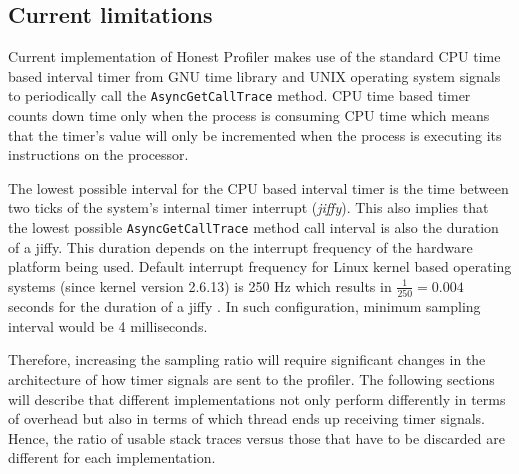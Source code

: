 \documentclass[..thesis.tex]{subfiles}
\begin{document}

\subsection{Current limitations}
Current implementation of Honest Profiler makes use of the standard CPU time based interval timer from GNU time library and UNIX operating system signals to periodically call the \texttt{AsyncGetCallTrace} method. CPU time based timer counts down time only when the process is consuming CPU time which means that the timer's value will only be incremented when the process is executing its instructions on the processor.

The lowest possible interval for the CPU based interval timer is the time between two ticks of the system's internal timer interrupt (\textit{jiffy}). This also implies that the lowest possible \texttt{Async\-Get\-Call\-Trace} method call interval is also the duration of a jiffy. This duration depends on the interrupt frequency of the hardware platform being used. Default interrupt frequency for Linux kernel based operating systems (since kernel version 2.6.13) is 250 Hz which results in $\frac{1}{250} = 0.004$ seconds for the duration of a jiffy \cite{linux_time}. In such configuration, minimum sampling interval would be 4 milliseconds.

Therefore, increasing the sampling ratio will require significant changes in the architecture of how timer signals are sent to the profiler. The following sections will describe that different implementations not only perform differently in terms of overhead but also in terms of which thread ends up receiving timer signals. Hence, the ratio of usable stack traces versus those that have to be discarded are different for each implementation.
\end{document}
